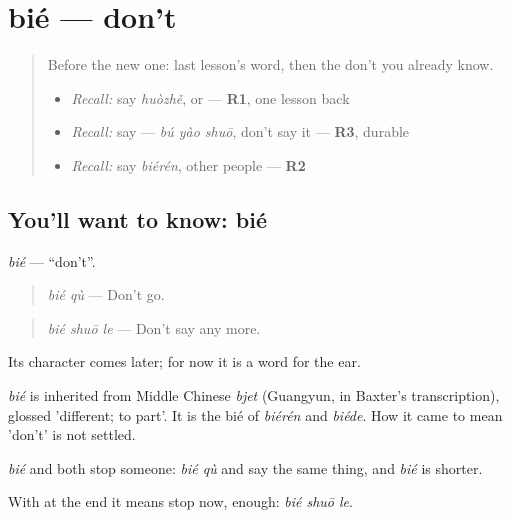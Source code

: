\section[bié]{bié — don't}

\label{lesson:ZH-C154-bie}



\begin{quote}
Before the new one: last lesson's word, then the don't you already know.

\begin{itemize}
\raggedright
  \item \emph{Recall:} say \emph{huòzhě}, or — \textbf{R1}, one lesson back
  \item \emph{Recall:} say  — \emph{bú yào shuō}, don't say it — \textbf{R3}, durable
  \item \emph{Recall:} say \emph{biérén}, other people — \textbf{R2}
\end{itemize}
\end{quote}

\subsection*{You'll want to know: bié}
\emph{bié} — \textquotedblleft{}don't\textquotedblright{}.

\begin{quote}
\emph{bié qù} — Don't go.
\end{quote}

\begin{quote}
\emph{bié shuō le} — Don't say any more.
\end{quote}

Its character comes later; for now it is a word for the ear.

\begin{cousinweb}
\emph{bié} is inherited from Middle Chinese \emph{bjet} (Guangyun, in Baxter's transcription), glossed 'different; to part'. It is the bié of \emph{biérén} and \emph{biéde}. How it came to mean 'don't' is not settled.
\end{cousinweb}

\begin{grammarlens}[title={What you've built}]
\emph{bié} and  both stop someone: \emph{bié qù} and  say the same thing, and \emph{bié} is shorter.

With  at the end it means stop now, enough: \emph{bié shuō le}.
\end{grammarlens}

